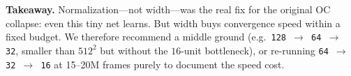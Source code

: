 \documentclass[11pt]{article}
\begin{document}
\textbf{Takeaway.} Normalization---not width---was the real fix for the original OC collapse:
even this tiny net learns. But width buys convergence speed within a fixed budget. We therefore
recommend a middle ground (e.g.\ \texttt{128\,$\to$\,64\,$\to$\,32}, smaller than $512^2$ but
without the $16$-unit bottleneck), or re-running \texttt{64\,$\to$\,32\,$\to$\,16} at 15--20M
frames purely to document the speed cost.
\end{document}
